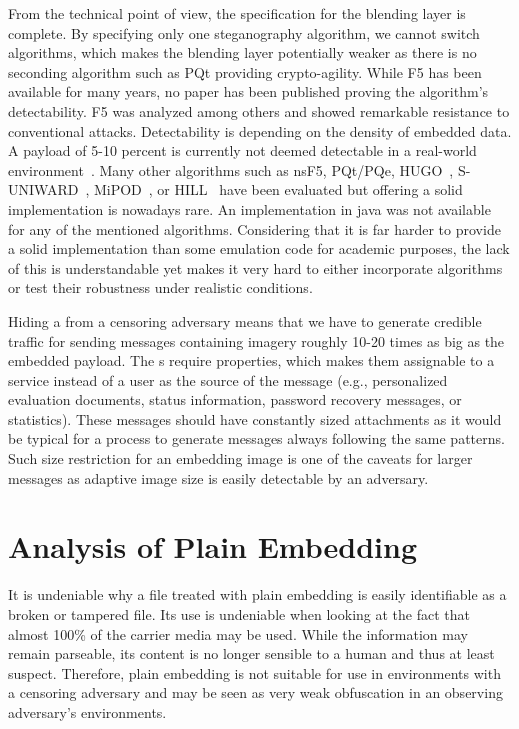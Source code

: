 From the technical point of view, the specification for the blending layer is complete. By specifying only one steganography algorithm, we cannot switch algorithms, which makes the blending layer potentially weaker as there is no seconding algorithm such as PQt providing crypto-agility. While F5 has been available for many years, no paper has been published proving the algorithm's detectability. F5 was analyzed among others and showed remarkable resistance to conventional attacks. Detectability is depending on the density of embedded data. A payload of 5-10 percent is currently not deemed detectable in a real-world environment~\cite{fridrich2007statistically}. Many other algorithms such as nsF5, PQt/PQe, HUGO~\cite{pevny2010using}, S-UNIWARD~\cite{holub2014universal}, MiPOD~\cite{sedighi2015content}, or HILL~\cite{li2014new} have been evaluated but offering a solid implementation is nowadays rare. An implementation in java was not available for any of the mentioned algorithms. Considering that it is far harder to provide a solid implementation than some emulation code for academic purposes, the lack of this is understandable yet makes it very hard to either incorporate algorithms or test their robustness under realistic conditions.

Hiding a \VortexNode{} from a censoring adversary means that we have to generate credible traffic for sending messages containing imagery roughly 10-20 times as big as the embedded payload. The s require properties, which makes them assignable to a service instead of a user as the source of the message (e.g., personalized evaluation documents, status information, password recovery messages, or statistics). These messages should have constantly sized attachments as it would be typical for a process to generate messages always following the same patterns. Such size restriction for an embedding image is one of the caveats for larger messages as adaptive image size is easily detectable by an adversary. 

\section{Analysis of Plain Embedding}
It is undeniable why a file treated with plain embedding is easily identifiable as a broken or tampered file. Its use is undeniable when looking at the fact that almost 100\% of the carrier media may be used. While the information may remain parseable, its content is no longer sensible to a human and thus at least suspect. Therefore, plain embedding is not suitable for use in environments with a censoring adversary and may be seen as very weak obfuscation in an observing adversary's environments.

